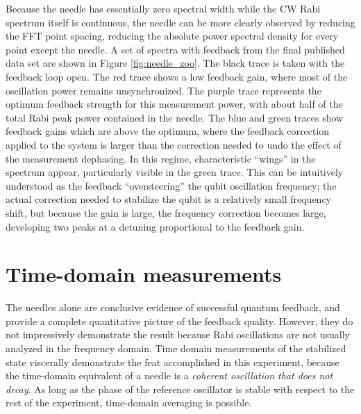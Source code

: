 Because the needle has essentially zero spectral width while the CW Rabi spectrum itself is continuous, the needle can be more clearly observed by reducing the FFT point spacing, reducing the absolute power spectral density for every point except the needle.  A set of spectra with feedback from the final published data set are shown in Figure \ref{fig:needle_zoo}.  The black trace is taken with the feedback loop open.  The red trace shows a low feedback gain, where most of the oscillation power remains unsynchronized.  The purple trace represents the optimum feedback strength for this measurement power, with about half of the total Rabi peak power contained in the needle.  The blue and green traces show feedback gains which are above the optimum, where the feedback correction applied to the system is larger than the correction needed to undo the effect of the measurement dephasing.  In this regime, characteristic ``wings'' in the spectrum appear, particularly visible in the green trace.  This can be intuitively understood as the feedback ``oversteering'' the qubit oscillation frequency; the actual correction needed to stabilize the qubit is a relatively small frequency shift, but because the gain is large, the frequency correction becomes large, developing two peaks at a detuning proportional to the feedback gain.

\section{Time-domain measurements}

The needles alone are conclusive evidence of successful quantum feedback, and provide a complete quantitative picture of the feedback quality.  However, they do not impressively demonstrate the result because Rabi oscillations are not usually analyzed in the frequency domain.  Time domain measurements of the stabilized state viscerally demonstrate the feat accomplished in this experiment, because the time-domain equivalent of a needle is a \textit{coherent oscillation that does not decay}.  As long as the phase of the reference oscillator is stable with respect to the rest of the experiment, time-domain averaging is possible.

